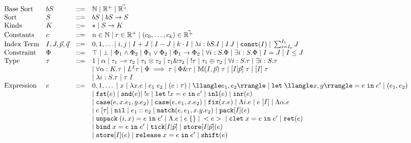 $$
\begin{array}{llll}
\text{Base Sort} & bS & ::= & \mathbb{N} \; | \; \mathbb{R}^+ \; | \; \vec{\mathbb{R}^+}\\
\text{Sort} & S & ::= & bS \;|\; bS \to S\\
\text{Kinds} & K & ::= & \star \;|\; S \to K\\
\text{Constants} & c & ::= & n \in \mathbb{N} \;|\; r \in \mathbb{R}^+ \;|\; (c_0,\dots,c_k) \in \vec{\mathbb{R}^+}\\
\text{Index Term} & I,J,\vec{p},\vec{q} & ::= & 0,1,\dots | \; i,j \; | \; I + J \; | \; I - J \; | \; k \cdot I \; | \; \lambda i : bS. I \; | \; I \, J \; | \; \texttt{const}(I) \;|\; \sum_{i=I_0}^{I_1} J

\\
\text{Constraint} & \Phi & ::= & \top \; | \; \bot \; | \; \Phi_1 \wedge \Phi_2 \;|\; \Phi_1 \vee \Phi_2  \;|\; \Phi_1 \to \Phi_2 \;|\; \forall i : S. \Phi \;|\; \exists i : S.\Phi \;|\; I = J \;|\; I \leq J\\
\text{Type} & \tau & ::= & 1 \;|\; \alpha \;|\; \tau_1 \loli \tau_2 \;|\; \tau_1 \otimes \tau_2 \;|\; \tau_1 \amp \tau_2 \;|\; !\tau \;|\; \tau_1 \oplus \tau_2 \;|\; \forall i : S . \tau \;|\; \exists i : S. \tau\\ 
&&&|\; \forall \alpha : K. \tau \;|\; L^I \tau \;|\; \Phi \implies \tau \;|\; \Phi \amp \tau \;|\; \M(I,\vec{p}) \; \tau \;|\; [I|\vec{p}] \; \tau \;|\; [I] \; \tau\\
&&&|\; \lambda i : S. \tau \;|\; \tau \; I\\
\text{Expression} & e & ::= & 0,1,\dots \;|\; x \;|\; \lambda x. e \;|\; e_1 \; e_2 \;|\; (e : \tau) \;|\; \llangle e_1,e_2 \rrangle \;|\; \texttt{let} \; \llangle x,y \rrangle = e\; \texttt{in} \; e' \;|\; (e_1,e_2) \\
&&&|\; \texttt{fst}(e) \;|\; \texttt{snd}(e) |\; !e \;|\; \texttt{let} \; !x = e \; \texttt{in} \; e' \;|\; \texttt{inl}(e) \;|\; \texttt{inr}(e) \\
&&&|\; \texttt{case}(e,x.e_1,y.e_2) \;|\; \texttt{case}(e,e_1,x.e_2) \;|\; \texttt{fix}(x.e) \;|\; \Lambda i. e \;|\; e \; [I] \;|\; \Lambda \alpha.e \\
&&&|\; e \; [\tau] \;|\; \texttt{nil} \;|\; e_1 :: e_2 \;|\; \texttt{match}(e,e_1,x.y.e_2) \;|\; \texttt{pack}[I](e)\\\
&&&|\; \texttt{unpack} \; (i,x) = e \; \texttt{in} \; e' \;|\; \Lambda. e \;|\; e \;\{\} \;|\; <e> \;|\; \texttt{clet} \; x = e \; \texttt{in} \; e' \;|\; \texttt{ret}(e)\\
&&&|\; \texttt{bind} \; x = e \; \texttt{in} \; e' \;|\; \texttt{tick}[I|\vec{p}] \;|\; \texttt{store}[I|\vec{p}](e) \\
&&& |\; \texttt{store}[I](e) \;|\; \texttt{release} \; x = e \; \texttt{in} \; e' \;|\; \texttt{shift}(e)
\end{array}
$$
